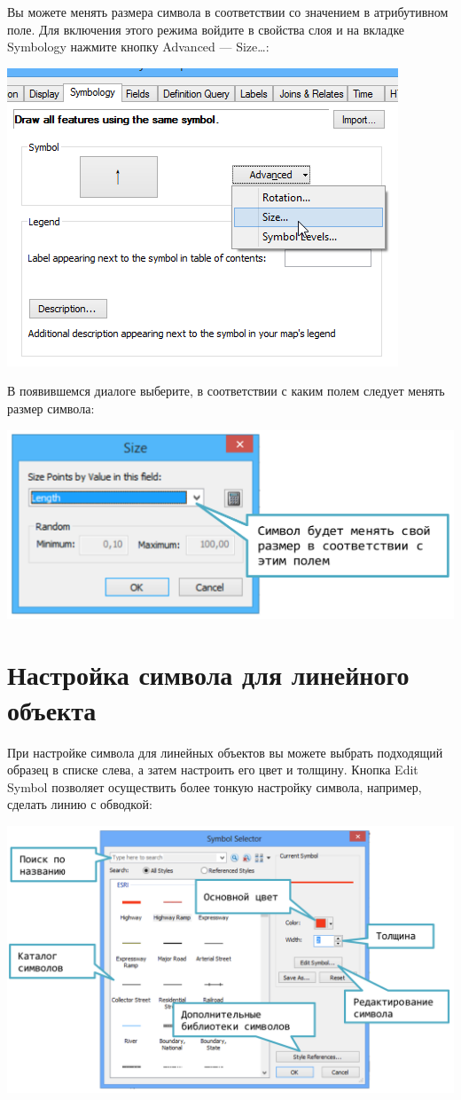 \documentclass[12pt,]{book}
\begin{document}
Вы можете менять размера символа в соответствии со значением в атрибутивном поле. Для включения этого режима войдите в свойства слоя и на вкладке Symbology нажмите кнопку Advanced --- Size\ldots{}:

\includegraphics{images/Appendix/image29.png}

В появившемся диалоге выберите, в соответствии с каким полем следует менять размер символа:

\includegraphics{images/Appendix/image30.png}

\hypertarget{manual-vector-line}{%
\section{Настройка символа для линейного объекта}\label{manual-vector-line}}

При настройке символа для линейных объектов вы можете выбрать подходящий образец в списке слева, а затем настроить его цвет и толщину. Кнопка Edit Symbol позволяет осуществить более тонкую настройку символа, например, сделать линию с обводкой:

\includegraphics{images/Appendix/image31.png}
\end{document}
